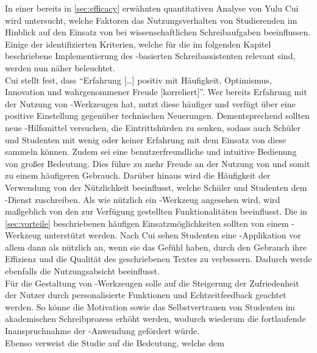 \documentclass[../main.tex]{subfiles}
\begin{document}
In einer bereits in \autoref{sec:efficacy} erwähnten quantitativen Analyse von Yulu Cui wird untersucht, welche Faktoren das Nutzungsverhalten von Studierenden im Hinblick auf den 
Einsatz von   bei wissenschaftlichen Schreibaufgaben beeinflussen\cite{influencingUsingAi}. Einige der identifizierten Kriterien, welche für die im folgenden Kapitel 
beschriebene Implementierung des -basierten Schreibassistenten relevant sind, werden nun näher beleuchtet. \\ 
Cui stellt fest, dass "`Erfahrung […] positiv mit Häufigkeit, Optimismus, Innovation und wahrgenommener Freude [korreliert]"'\cite[6]{influencingUsingAi}. Wer bereits 
Erfahrung mit der Nutzung von -Werkzeugen hat, nutzt diese häufiger und verfügt über eine positive Einstellung gegenüber technischen Neuerungen. Dementsprechend 
sollten neue -Hilfsmittel versuchen, die Eintrittshürden zu senken, sodass auch Schüler und Studenten mit wenig oder keiner Erfahrung mit dem Einsatz von  diese 
sammeln können. Zudem sei eine benutzerfreundliche und intuitive Bedienung von großer Bedeutung\cite[6]{influencingUsingAi}. Dies führe zu mehr Freude an der Nutzung 
von  und somit zu einem häufigeren Gebrauch. Darüber hinaus wird die Häufigkeit der Verwendung von der Nützlichkeit beeinflusst, welche Schüler und Studenten 
dem -Dienst zuschreiben. Als wie nützlich ein -Werkzeug angesehen wird, wird maßgeblich von den zur Verfügung gestellten Funktionalitäten beeinflusst. Die in 
\autoref{sec:vorteile} beschriebenen häufigen Einsatzmöglichkeiten sollten von einem -Werkzeug unterstützt werden. Nach Cui sehen Studenten eine -Applikation vor allem dann 
als nützlich an, wenn sie das Gefühl haben, durch den Gebrauch ihre Effizienz und die Qualität des geschriebenen Textes zu verbessern. Dadurch werde ebenfalls die 
Nutzungsabsicht beeinflusst\cite[7]{influencingUsingAi}. \\
Für die Gestaltung von -Werkzeugen solle auf die Steigerung der Zufriedenheit der Nutzer durch personalisierte Funktionen und Echtzeitfeedback geachtet 
werden\cite[10]{influencingUsingAi}. So könne die Motivation sowie das Selbstvertrauen von Studenten im akademischen Schreibprozess erhöht werden, wodurch 
wiederum die fortlaufende Inanspruchnahme der -Anwendung gefördert würde\cite[10]{influencingUsingAi}. \\Ebenso verweist die Studie auf die Bedeutung, welche dem 
\end{document}
